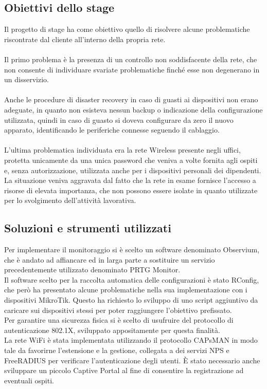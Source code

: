 \documentclass[Tesi.tex]{subfiles}
\begin{document}
\subsection{Obiettivi dello stage}
Il progetto di stage ha come obiettivo quello di risolvere alcune problematiche riscontrate dal cliente all'interno della propria rete. \\\\
Il primo problema è la presenza di un controllo non soddisfacente della rete, che non consente di individuare svariate problematiche finché esse non degenerano in un disservizio. \\\\
Anche le procedure di disaster recovery in caso di guasti ai dispositivi non erano adeguate, in quanto non esisteva nessun backup o indicazione della configurazione utilizzata, quindi in caso di guasto si doveva configurare da zero il nuovo apparato, identificando le periferiche connesse seguendo il cablaggio.\\\\
L'ultima problematica individuata era la rete Wireless presente negli uffici, protetta unicamente da una unica password  che veniva a volte fornita agli ospiti e, senza autorizzazione, utilizzata anche per i dispositivi personali dei dipendenti. La situazione veniva aggravata dal fatto che la rete in esame fornisce l'accesso a risorse di elevata importanza, che non possono essere isolate in quanto utilizzate per lo svolgimento dell'attività lavorativa.

\subsection{Soluzioni e strumenti utilizzati}
Per implementare il monitoraggio si è scelto un software denominato Observium, che è andato ad affiancare ed in larga parte a sostituire un servizio precedentemente utilizzato denominato PRTG Monitor. \\

Il software scelto per la raccolta automatica delle configurazioni è stato RConfig, che però ha presentato alcune problematiche nella sua implementazione con i dispositivi MikroTik. Questo ha richiesto lo sviluppo di uno script aggiuntivo da caricare sui dispositivi stessi per poter raggiungere l'obiettivo prefissato. \\

Per garantire una sicurezza fisica si è scelto di usufruire del protocollo di autenticazione 802.1X, sviluppato appositamente per questa finalità.\\
La rete WiFi è stata implementata utilizzando il protocollo CAPsMAN in modo tale da favorirne l'estensione e la gestione, collegata a dei servizi NPS e FreeRADIUS per verificare l'autenticazione degli utenti. \`{E} stato necessario anche sviluppare un piccolo Captive Portal al fine di consentire la registrazione ad eventuali ospiti.
\end{document}
